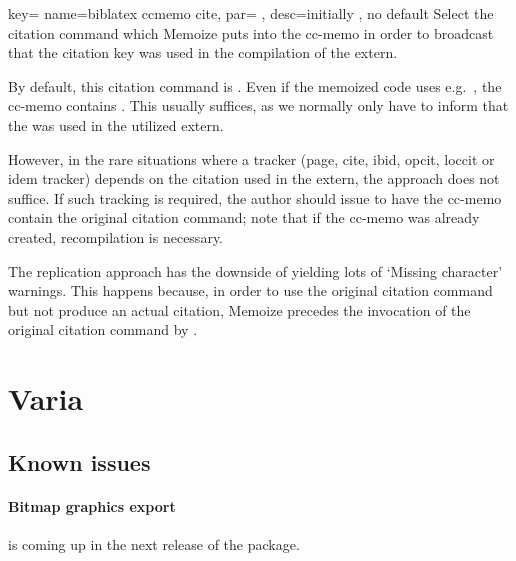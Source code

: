 \documentclass[a4paper,11pt]{article}
\begin{document}
\begin{doc}{
    key={
      name=biblatex ccmemo cite,
      par={%
      },
      desc={initially , no default}
    }
  }
  Select the citation command which Memoize puts into the cc-memo in order to
  broadcast that the citation key was used in the compilation of the extern.

  By default, this citation command is .  Even if the memoized code
  uses e.g.\ , the cc-memo contains
  .  This usually suffices, as we
  normally only have to inform  that the  was
  used in the utilized extern.

  However, in the rare situations where a tracker (page, cite, ibid, opcit,
  loccit or idem tracker) depends on the citation used in the extern, the
   approach does not suffice.  If such tracking is required, the
  author should issue  to have the cc-memo contain the original citation
  command; note that if the cc-memo was already created, recompilation is
  necessary.

  The replication approach has the downside of yielding lots of `Missing
  character' warnings.  This happens because, in order to use the original
  citation command but not produce an actual citation, Memoize precedes the
  invocation of the original citation command by .
\end{doc}

\section{Varia}

\subsectionclearpagefalse

\subsection{Known issues}
\label{sec:known-issues}

\paragraph*{Bitmap graphics export} is coming up in the next release of the
package.
\end{document}

